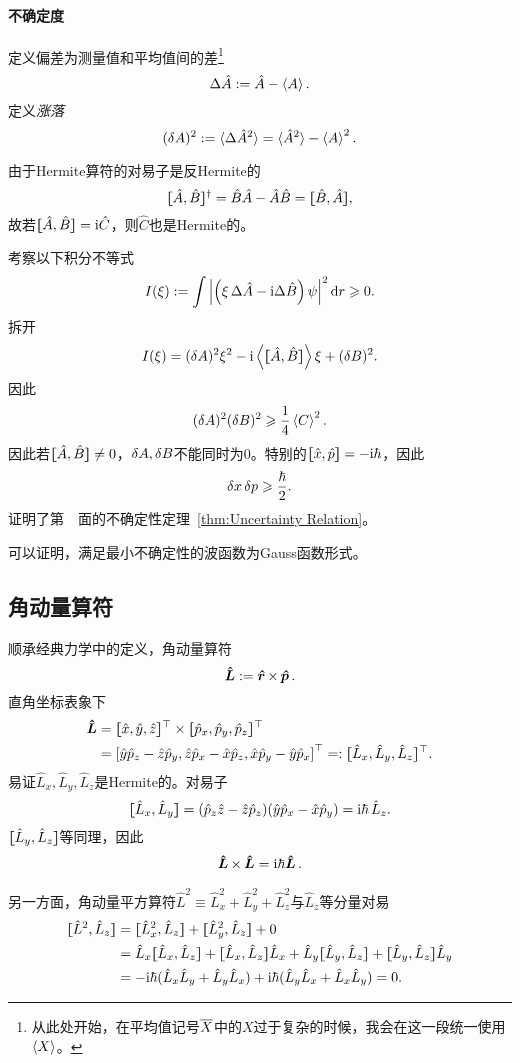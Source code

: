 \paragraph*{不确定度}定义偏差为测量值和平均值间的差\footnote{从此处开始，在平均值记号$\avg X$中的$X$过于复杂的时候，我会在这一段统一使用$\ave X$。}
\[
	\D\hat A:=\hat A-\ave A.
\]
定义\textit{涨落}
\[
	(\vd A)^2:=\langle\D\hat A^2\rangle=\langle\hat A^2\rangle-\ave A^2.
\]

由于Hermite算符的对易子是反Hermite的
\[
	\cmm AB\dg=\hat B\hat A-\hat A\hat B=\cmm BA,
\]
故若$\cmm AB=\i\hat C$，则$\hat C$也是Hermite的。

考察以下积分不等式
\[
I(\xi):=\int\abs{\kh{\xi\,\D\hat A-\i\D\hat B}\psi}^2\d r\geqslant 0.
\]
拆开
\[
I(\xi)=(\vd A)^2\xi^2-\i\ave{\cmm AB}\xi+(\vd B)^2.
\]
因此
\begin{align}
	(\vd A)^2(\vd B)^2\geqslant\frac14\ave C^2.
\end{align}
因此若$\cmm AB\neq 0$，$\vd A,\vd B$不能同时为0。特别的$\cmm xp=-\i\hbar$，因此
\begin{align}
	\vd x\vd p\geqslant\frac{\hbar}2.\label{Proof of UR}
\end{align}
证明了第~\pageref{thm:Uncertainty Relation}~面的不确定性定理~\ref{thm:Uncertainty Relation}。

可以证明，满足最小不确定性的波函数为Gauss函数形式。
\subsection{角动量算符}
顺承经典力学中的定义，角动量算符
\[
	\qo L:=\qo r\times\,\qo p.
\]
直角坐标表象下
\begin{align*}
	\qo L & =\zkh{\hat x,\hat y,\hat z}\tp\times\zkh{\hat p_x,\hat p_y,\hat p_z}\tp                             \\
	      & =\fkh{\hat y\hat p_z-\hat z\hat p_y,\hat z\hat p_x-\hat x\hat p_z,\hat x\hat p_y-\hat y\hat p_x}\tp %
	=:\zkh{\hat L_x,\hat L_y,\hat L_z}\tp.
\end{align*}
易证$\hat L_x,\hat L_y,\hat L_z$是Hermite的。对易子
\[
	\cmm{L_x}{L_y}=(\hat p_z\hat z-\hat z\hat p_z)(\hat y\hat p_x-\hat x\hat p_y)=\i\hbar\,\hat L_z.
\]
$\cmm{L_y}{L_z}$等同理，因此
\begin{align}
	\qo L\times\,\qo L=\i\hbar\qo L.
\end{align}

另一方面，角动量平方算符$\hat L^2\equiv\hat L_x^2+\hat L_y^2+\hat L_z^2$与$\hat L_z$等分量对易
\begin{align}\notag
	\cmm{L^2}{L_z}&=\cmm{L^2_x}{L_z}+\cmm{L^2_y}{L_z}+0\\\notag
	&=\hat L_x\cmm{L_x}{L_z}+\cmm{L_x}{L_z}\hat L_x+\hat L_y\cmm{L_y}{L_z}+\cmm{L_y}{L_z}\hat L_y\\
	&=-\i\hbar(\hat L_x\hat L_y+\hat L_y\hat L_x)+\i\hbar(\hat L_y\hat L_x+\hat L_x\hat L_y)=0.
\end{align}

